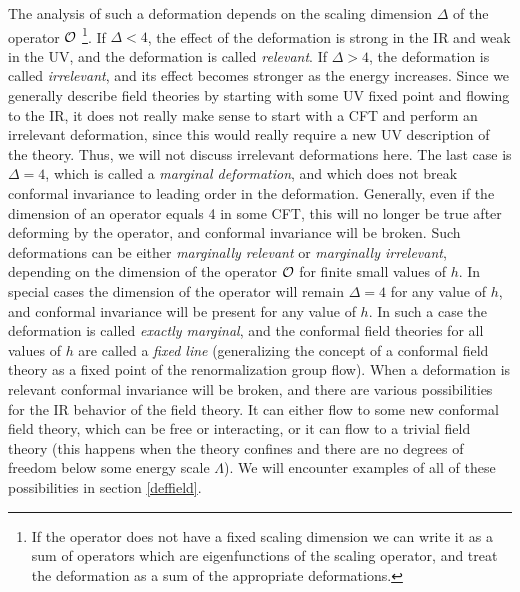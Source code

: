  The analysis of such a deformation depends on the scaling dimension
 $\Delta$ of the operator $\cal O$ \footnote{If the operator does not
 have a fixed scaling dimension we can write it as a sum of operators
 which are eigenfunctions of the scaling operator, and treat the
 deformation as a sum of the appropriate deformations.}. If $\Delta <
 4$, the effect of the deformation is strong in the IR and weak in the
 UV, and the deformation is called {\it relevant}. If $\Delta > 4$,
 the deformation is called {\it irrelevant}, and its effect becomes
 stronger as the energy increases. Since we generally describe field
 theories by starting with some UV fixed point and flowing to the IR,
 it does not really make sense to start with a CFT and perform an
 irrelevant deformation, since this would really require a new UV
 description of the theory. Thus, we will not discuss irrelevant
 deformations here. The last case is $\Delta=4$, which is called a
 {\it marginal deformation}, and which does not break conformal
 invariance to leading order in the deformation. Generally, even if
 the dimension of an operator equals 4 in some CFT, this will no
 longer be true after deforming by the operator, and conformal
 invariance will be broken. Such deformations can be either {\it
 marginally relevant} or {\it marginally irrelevant}, depending on the
 dimension of the operator $\cal O$ for finite small values of $h$. In
 special cases the dimension of the operator will remain $\Delta=4$
 for any value of $h$, and conformal invariance will be present for
 any value of $h$. In such a case the deformation is called {\it
 exactly marginal}, and the conformal field theories for all values of
 $h$ are called a {\it fixed line} (generalizing the concept of a
 conformal field theory as a fixed point of the renormalization group
 flow). When a deformation is relevant conformal invariance will be
 broken, and there are various possibilities for the IR behavior of
 the field theory. It can either flow to some new conformal field
 theory, which can be free or interacting, or it can flow to a trivial
 field theory (this happens when the theory confines and there are no
 degrees of freedom below some energy scale $\Lambda$). We will
 encounter examples of all of these possibilities in section
 \ref{deffield}.

